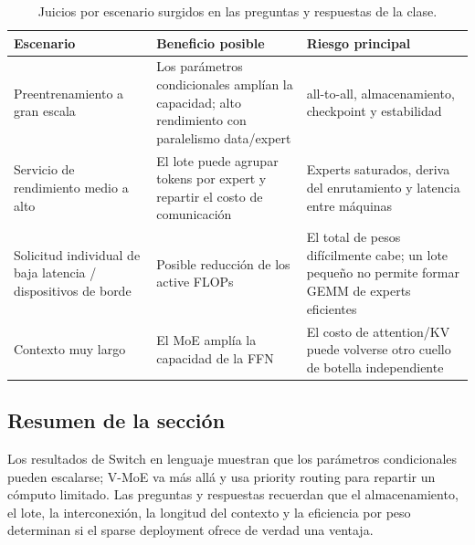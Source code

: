 \begin{table}[H]
\centering
\small
\caption{Juicios por escenario surgidos en las preguntas y respuestas de la clase.}
\begin{tabularx}{\textwidth}{L{0.28\textwidth}X X}
\toprule
Escenario & Beneficio posible & Riesgo principal \\
\midrule
Preentrenamiento a gran escala & Los parámetros condicionales amplían la capacidad; alto rendimiento con paralelismo data/expert & all-to-all, almacenamiento, checkpoint y estabilidad \\
Servicio de rendimiento medio a alto & El lote puede agrupar tokens por expert y repartir el costo de comunicación & Experts saturados, deriva del enrutamiento y latencia entre máquinas \\
Solicitud individual de baja latencia / dispositivos de borde & Posible reducción de los active FLOPs & El total de pesos difícilmente cabe; un lote pequeño no permite formar GEMM de experts eficientes \\
Contexto muy largo & El MoE amplía la capacidad de la FFN & El costo de attention/KV puede volverse otro cuello de botella independiente \\
\bottomrule
\end{tabularx}
\end{table}


\subsection{Resumen de la sección}

Los resultados de Switch en lenguaje muestran que los parámetros condicionales pueden escalarse; V-MoE va más allá y usa priority routing para repartir un cómputo limitado. Las preguntas y respuestas recuerdan que el almacenamiento, el lote, la interconexión, la longitud del contexto y la eficiencia por peso determinan si el sparse deployment ofrece de verdad una ventaja.
